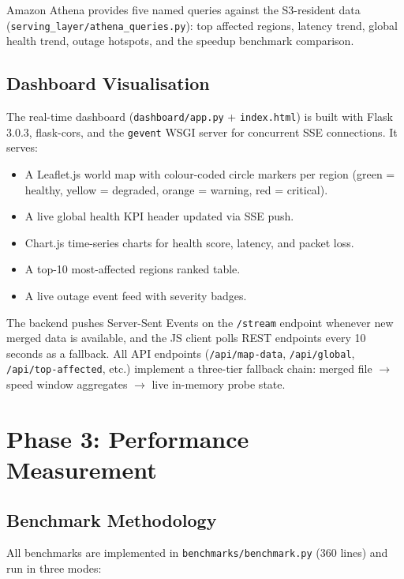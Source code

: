 \documentclass[conference]{IEEEtran}
\begin{document}
Amazon Athena provides five named queries against the S3-resident data
(\texttt{serving\_layer/athena\_queries.py}): top affected regions, latency trend,
global health trend, outage hotspots, and the speedup benchmark comparison.

\subsection{Dashboard Visualisation}

The real-time dashboard (\texttt{dashboard/app.py} + \texttt{index.html}) is built
with Flask 3.0.3, flask-cors, and the \texttt{gevent} WSGI server for concurrent
SSE connections. It serves:

\begin{itemize}
  \item A Leaflet.js world map with colour-coded circle markers per region
    (green = healthy, yellow = degraded, orange = warning, red = critical).
  \item A live global health KPI header updated via SSE push.
  \item Chart.js time-series charts for health score, latency, and packet loss.
  \item A top-10 most-affected regions ranked table.
  \item A live outage event feed with severity badges.
\end{itemize}

The backend pushes Server-Sent Events on the \texttt{/stream} endpoint whenever
new merged data is available, and the JS client polls REST endpoints every 10
seconds as a fallback. All API endpoints (\texttt{/api/map-data},
\texttt{/api/global}, \texttt{/api/top-affected}, etc.) implement a three-tier
fallback chain: merged file $\to$ speed window aggregates $\to$ live in-memory
probe state.

\section{Phase 3: Performance Measurement}

\subsection{Benchmark Methodology}

All benchmarks are implemented in \texttt{benchmarks/benchmark.py} (360 lines)
and run in three modes:
\end{document}
